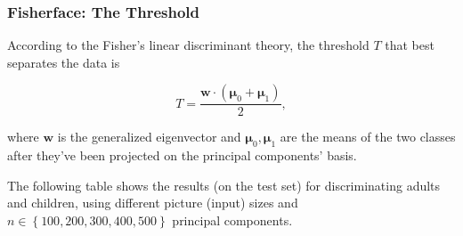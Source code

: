 \documentclass{beamer}
\begin{document}
	\begin{frame}
		\frametitle{Fisherface: The Threshold}
		According to the Fisher's linear discriminant theory, the threshold $T$ that best separates the data is
		
		\begin{equation*}
		T = \frac{\bm{w} \cdot (\bm{\mu}_0 + \bm{\mu}_1)}{2}, 
		\end{equation*}
		
		where $\bm{w}$ is the generalized eigenvector and $\bm{\mu}_0, \bm{\mu}_1$ are the means of the two classes after they've been projected on the principal components' basis.
		
		\bigskip
		 
		The following table shows the results (on the test set) for discriminating adults and children, using different picture (input) sizes and $n \in \left\{ 100,200,300,400,500\right\}$ principal components.
	\end{frame}
\end{document}
